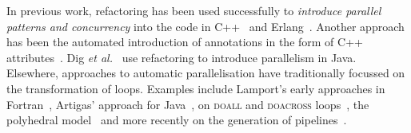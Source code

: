 \documentclass[a4paper,11pt]{article}
\begin{document}

In previous work, refactoring has been used successfully to \emph{introduce parallel patterns and concurrency} into the code in C++~\cite{brownagricultural,DBLP:conf/pdp/JanjicBMHDAG16, grppirefactoring, mcts} and Erlang~\cite{hlpp,DBLP:journals/cai/BarwellBHTB16}. Another approach
has been the automated introduction of annotations in the form of
C++ attributes~\cite{rio:2018}. Dig \textit{et al.}~\cite{dig} use refactoring to introduce parallelism in Java.  
%
%
%
Elsewhere, approaches to automatic parallelisation have traditionally focussed on the transformation of loops. Examples include Lamport's early approaches in Fortran~\cite{DBLP:journals/cacm/Lamport74}, Artigas' approach for Java~\cite{kennedy}, on \textsc{doall} and \textsc{doacross} loops~\cite{DBLP:conf/pldi/BurkeC86,DBLP:conf/popl/LimL97}, the polyhedral model~\cite{DBLP:conf/ppopp/AncourtI91,DBLP:conf/IEEEpact/Bastoul04,DBLP:conf/IEEEpact/BouletF98} and more recently on the generation of pipelines~\cite{DBLP:conf/IEEEpact/TournavitisF10,DBLP:journals/taco/WangTFO14}. 
\end{document}
